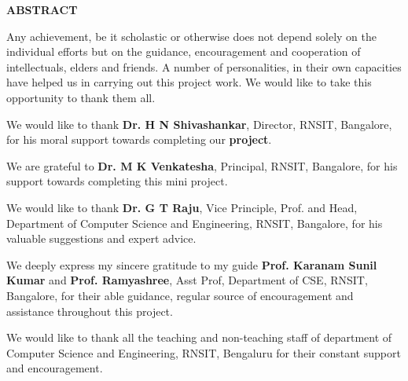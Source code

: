 \pagestyle{empty}
\begin{center}
\textup{\Large{\textbf{ABSTRACT}}}
\end{center}

\justify
\indent
Any achievement, be it scholastic or otherwise does not depend solely on the individual efforts but on the guidance, encouragement and cooperation of intellectuals, elders and friends. A number of personalities, in their own capacities have helped us in carrying out this project work. We would like to take this opportunity to thank them all. 

We would like to thank \textbf{Dr. H N Shivashankar}, Director, RNSIT, Bangalore, for his moral support towards completing our \textbf{project}.

We are grateful to \textbf{Dr. M K Venkatesha}, Principal, RNSIT, Bangalore, for his support towards completing this mini project. 

We would like to thank \textbf{Dr. G T Raju}, Vice Principle, Prof. and Head, Department of Computer Science and Engineering, RNSIT, Bangalore, for his valuable suggestions and expert advice. 

We deeply express my sincere gratitude to my guide \textbf{Prof. Karanam Sunil Kumar} and \textbf{Prof. Ramyashree}, Asst Prof, Department of CSE, RNSIT, Bangalore, for their able guidance, regular source of encouragement and assistance throughout this project. 

We would like to thank all the teaching and non-teaching staff of department of Computer Science and Engineering, RNSIT, Bengaluru for their constant support and encouragement.


\pagebreak
